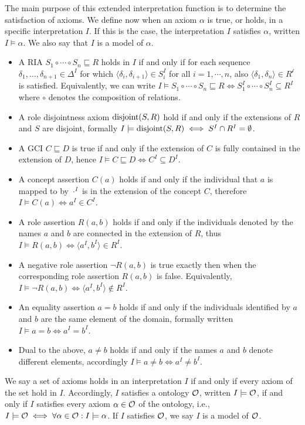 The main purpose of this extended interpretation function is to determine the satisfaction of axioms. We define now when an axiom $\alpha$ is true, or holds, in a specific interpretation $I$. If this is the case, the interpretation $I$ satisfies $\alpha$, written $I \models \alpha$. We also say that $I$ is a model of $\alpha$.
\begin{itemize}
  \item A RIA $S_1 \circ \cdots \circ S_n \sqsubseteq R$ holds in $I$ if and only if for each sequence $\delta_1, \dots, \delta_{n + 1} \in \Delta^I$ for which $\langle \delta_i , \delta_{i + 1} \rangle \in S_i^I$ for all $i = 1, \cdots, n$, also $\langle \delta_1 , \delta_n \rangle \in R^\mathcal{i}$ is satisfied. Equivalently, we can write $I \models S_1 \circ \cdots \circ S_n \sqsubseteq R \iff S_1^I \circ \cdots \circ S_n^I \subseteq R^I$ where $\circ$ denotes the composition of relations.
  \item A role disjointness axiom $\operatorname{disjoint}(S, R)$ hold if and only if the extensions of $R$ and $S$ are disjoint, formally $I \models \operatorname{disjoint}(S, R) \iff S^I \cap R^I = \emptyset$.
  \item A GCI $C \sqsubseteq D$ is true if and only if the extension of $C$ is fully contained in the extension of $D$, hence $I \models C \sqsubseteq D \iff C^I \subseteq D^I$.
  \item A concept assertion $C(a)$ holds if and only if the individual that $a$ is mapped to by $\cdot^I$ is in the extension of the concept $C$, therefore $I \models C (a) \iff a^I \in C^I$.
  \item A role assertion $R(a, b)$ holds if and only if the individuals denoted by the names $a$ and $b$ are connected in the extension of $R$, thus $I \models R(a, b) \iff \langle a^I, b^I \rangle \in R^I$.
  \item A negative role assertion $\lnot R(a, b)$ is true exactly then when the corresponding role assertion $R(a, b)$ is false. Equivalently, $I \models \lnot R(a, b) \iff \langle a^I, b^I \rangle \not\in R^I$.
  \item An equality assertion $a = b$ holds if and only if the individuals identified by $a$ and $b$ are the same element of the domain, formally written $I \models a = b \iff a^I = b^I$.
  \item Dual to the above, $a \not = b$ holds if and only if the names $a$ and $b$ denote different elements, accordingly $I \models a \not= b \iff a^I \not= b^I$.
\end{itemize}
We say a set of axioms holds in an interpretation $I$ if and only if every axiom of the set hold in $I$. Accordingly, $I$ satisfies a ontology $\mathcal{O}$, written $I \models \mathcal{O}$, if and only if $I$ satisfies every axiom $\alpha \in \mathcal{O}$ of the ontology, i.e., $I \models \mathcal{O} \iff \forall \alpha \in \mathcal{O} : I \models \alpha$. If $I$ satisfies $\mathcal{O}$, we say $I$ is a model of $\mathcal{O}$.


